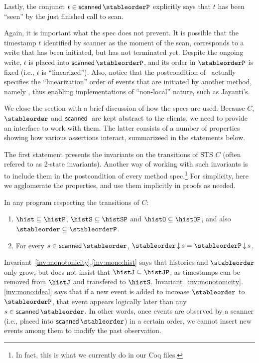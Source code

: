 Lastly, the conjunct $t \in \scanned\stableorderP$ explicitly says
that $t$ has been ``seen'' by the just finished call to scan. 

Again, it is important what the spec does not prevent. It is possible
that the timestamp $t$ identified by scanner as the moment of the
scan, corresponds to a write that has been initiated, but has not
terminated yet. Despite the ongoing write, $t$ is placed into
$\scanned\stableorderP$, and its order in $\stableorderP$ is fixed
(i.e., $t$ is ``linearized''). Also, notice that the postcondition of
\jyscan\ actually specifies the ``linearization'' order of events that
are initiated by another method, namely \jywrite, thus enabling
implementations of ``non-local'' nature, such as Jayanti's.


We close the section with a brief discussion of how the specs are
used. Because $C$, $\stableorder$ and $\scanned$ are kept abstract to
the clients, we need to provide an interface to work with them. The
latter consists of a number of properties showing how various
assertions interact, summarizeed in the statements below.

The first statement presents the invariants on the transitions of STS
$C$ (often refered to as 2-state invariants). Another way of working
with such invariants is to include them in the postcondition of every
method spec.\footnote{In fact, this is what we currently do in our Coq
  files.} For simplicity, here we agglomerate the properties, and use
them implicitly in proofs as needed.

\begin{invariant}\label{inv:monotonicity}
In any program respecting the transitions of $C$: 
\begin{enumerate}
\item\label{inv:mono:hist} $\hist \subseteq \histP$, $\histS \subseteq
  \histSP$ and $\histO \subseteq \histOP$, and also $\stableorder
  \subseteq \stableorderP$.
\item\label{inv:mono:ideal} For every $s \in \scanned{\stableorder}$,
  $\ideal{\stableorder}{s} = \ideal{\stableorderP}{s}$.
\end{enumerate}
\end{invariant}
%
Invariant~\ref{inv:monotonicity}.\ref{inv:mono:hist} says that
histories and $\stableorder$ only grow, but does not insist that
$\histJ \subseteq \histJP$, as timestamps can be removed from $\histJ$
and transfered to $\histS$.
Invariant~\ref{inv:monotonicity}.\ref{inv:mono:ideal} says that if a
new event is added to increase $\stableorder$ to $\stableorderP$, that
event appears logically later than any $s \in
\scanned{\stableorder}$. In other words, once events are observed by a
scanner (i.e., placed into $\scanned{\stableorder}$) in a certain
order, we cannot insert new events among them to modify the past
observation.

